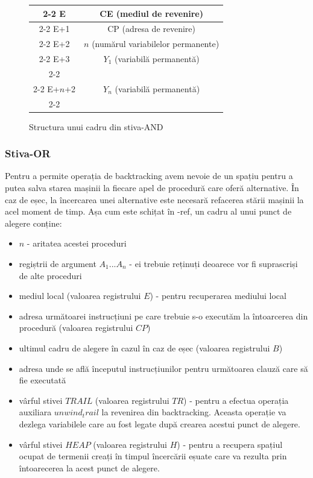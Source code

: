 \documentclass[12pt,a4paper,twoside]{report}
\begin{document}
\begin{figure}
\begin{center}
\begin{tabular}{c|c|}
\cline{2-2}
E & CE (mediul de revenire) \\
\cline{2-2}
E+1 & CP (adresa de revenire) \\
\cline{2-2}
E+2 & $n$ (numărul variabilelor permanente) \\
\cline{2-2}
E+3 & $Y_1$ (variabilă permanentă) \\
\cline{2-2}
\multicolumn{2}{c}{...} \\
\cline{2-2}
E+$n$+2 & $Y_n$ (variabilă permanentă) \\
\cline{2-2}
\end{tabular}
\end{center}
\caption{Structura unui cadru din stiva-AND} \label{fig:stiva-and}
\end{figure}

\subsubsection{Stiva-OR}
Pentru a permite operația de backtracking avem nevoie de un spațiu pentru a putea salva starea mașinii la fiecare apel de procedură care oferă alternative. În caz de eșec, la încercarea unei alternative este necesară refacerea stării mașinii la acel moment de timp. Așa cum este schițat în -ref, un cadru al unui punct de alegere conține:
\begin{itemize}
	\item $n$ - aritatea acestei proceduri
	\item regiștrii de argument $A_1 ... A_n$ - ei trebuie reținuți deoarece vor fi suprascriși de alte proceduri
	\item mediul local (valoarea registrului $E$) - pentru recuperarea mediului local
	\item adresa următoarei instrucțiuni pe care trebuie s-o executăm la întoarcerea din procedură (valoarea registrului $CP$)
	\item ultimul cadru de alegere în cazul în caz de eșec (valoarea registrului $B$)
	\item adresa unde se află începutul instrucțiunilor pentru următoarea clauză care să fie executată
	\item vârful stivei $TRAIL$ (valoarea registrului $TR$) - pentru a efectua operația auxiliara $unwind_trail$ la revenirea din backtracking. Aceasta operație va dezlega variabilele care au fost legate după crearea acestui punct de alegere.
	\item vârful stivei $HEAP$ (valoarea registrului $H$) - pentru a recupera spațiul ocupat de termenii creați în timpul încercării eșuate care va rezulta prin întoarecerea la acest punct de alegere.
\end{itemize}
\end{document}
